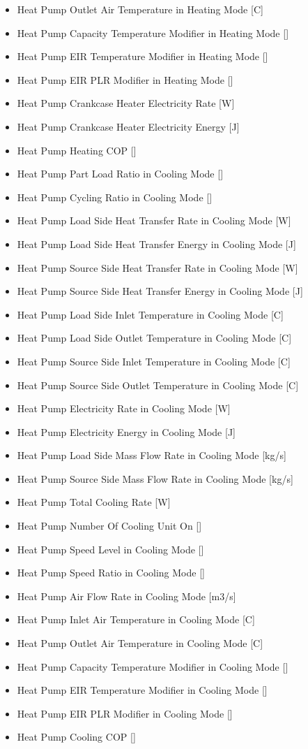 \begin{itemize}
\item Heat Pump Outlet Air Temperature in Heating Mode {[}C{]}
\item Heat Pump Capacity Temperature Modifier in Heating Mode {[}{]}
\item Heat Pump EIR Temperature Modifier in Heating Mode {[}{]}
\item Heat Pump EIR PLR Modifier in Heating Mode {[}{]}
\item Heat Pump Crankcase Heater Electricity Rate {[}W{]}
\item Heat Pump Crankcase Heater Electricity Energy {[}J{]}
\item Heat Pump Heating COP {[}{]}
\item Heat Pump Part Load Ratio in Cooling Mode {[}{]}
\item Heat Pump Cycling Ratio in Cooling Mode {[}{]}
\item Heat Pump Load Side Heat Transfer Rate in Cooling Mode {[}W{]}
\item Heat Pump Load Side Heat Transfer Energy in Cooling Mode {[}J{]}
\item Heat Pump Source Side Heat Transfer Rate in Cooling Mode {[}W{]}
\item Heat Pump Source Side Heat Transfer Energy in Cooling Mode {[}J{]}
\item Heat Pump Load Side Inlet Temperature in Cooling Mode {[}C{]}
\item Heat Pump Load Side Outlet Temperature in Cooling Mode {[}C{]}
\item Heat Pump Source Side Inlet Temperature in Cooling Mode {[}C{]}
\item Heat Pump Source Side Outlet Temperature in Cooling Mode {[}C{]}
\item Heat Pump Electricity Rate in Cooling Mode {[}W{]}
\item Heat Pump Electricity Energy in Cooling Mode {[}J{]}
\item Heat Pump Load Side Mass Flow Rate in Cooling Mode {[}kg/s{]}
\item Heat Pump Source Side Mass Flow Rate in Cooling Mode {[}kg/s{]}
\item Heat Pump Total Cooling Rate {[}W{]}
\item Heat Pump Number Of Cooling Unit On {[}{]}
\item Heat Pump Speed Level in Cooling Mode {[}{]}
\item Heat Pump Speed Ratio in Cooling Mode {[}{]}
\item Heat Pump Air Flow Rate in Cooling Mode {[}m3/s{]}
\item Heat Pump Inlet Air Temperature in Cooling Mode {[}C{]}
\item Heat Pump Outlet Air Temperature in Cooling Mode {[}C{]}
\item Heat Pump Capacity Temperature Modifier in Cooling Mode {[}{]}
\item Heat Pump EIR Temperature Modifier in Cooling Mode {[}{]}
\item Heat Pump EIR PLR Modifier in Cooling Mode {[}{]}
\item Heat Pump Cooling COP {[}{]}
\end{itemize}
